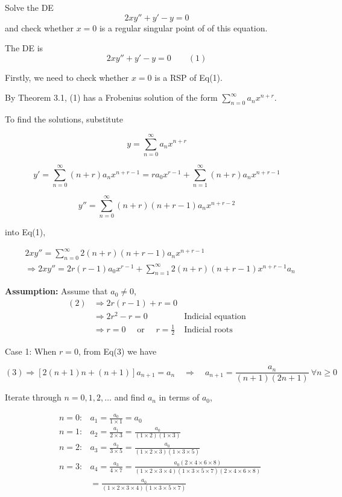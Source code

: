 \begin{example}
    Solve the DE
    \[
        2xy'' + y' - y = 0
    \]
    and check whether $x = 0$ is a regular singular point of of this equation.
\end{example}
\begin{solution}
    The DE is 
    \[
        2xy'' + y' - y = 0 \quad \quad (1)
    \]

    Firstly, we need to check whether $x = 0$ is a RSP of Eq(1).

    By Theorem 3.1,  (1) has a Frobenius solution of the form $\displaystyle \sum^\infty_{n=0} a_n x^{n+r}$.

    To find the solutions, substitute 

    \[
        y = \sum^\infty_{n=0} a_n x^{n+r}
    \]

    \[
        y' = \sum^\infty_{n=0} (n+r) a_n x^{n+r-1} = ra_0 x^{r-1} + \sum^\infty_{n=1} (n+r)a_nx^{n+r-1}
    \]

    \[
        y'' = \sum^\infty_{n=0} (n+r)(n+r-1) a_n x^{n+r-2}
    \]

    into Eq(1),

    \begin{align*}
        &2xy'' = \sum^\infty_{n=0} 2(n+r)(n+r-1)a_n x^{n+r-1}\\
        &\Rightarrow 2xy'' = 2r(r-1)a_0x^{r-1} + \sum^\infty_{n=1} 2(n+r)(n+r-1)x^{n+r-1} a_n
    \end{align*}

    \textbf{Assumption:} Assume that $a_0 \neq 0$, 
    \begin{align*}
        (2) &\Rightarrow 2r(r-1) + r = 0\\
        &\Rightarrow 2r^2 - r = 0 & \text{Indicial equation}\\
        &\Rightarrow r = 0 \quad \text{ or } \quad r = \frac{1}{2} & \text{Indicial roots}
    \end{align*}

    Case 1: When $r = 0$, from Eq(3) we have 

    \[
        (3) \Rightarrow [2(n+1)n + (n+1)]a_{n+1} = a_n \quad \Rightarrow \quad a_{n+1} = \frac{a_n}{(n+1)(2n+1)}\> \forall 
        n \geq 0
    \]

    Iterate through $n = 0, 1, 2, \ldots$ and find $a_n$ in terms of $a_0$,

    \begin{align*}
        &n = 0: &a_1 = \frac{a_0}{1 \times 1} = a_0\\
        &n = 1: &a_2 = \frac{a_1}{2 \times 3} = \frac{a_0}{(1 \times 2)(1 \times 3)}\\
        &n = 2: &a_3 = \frac{a_2}{3 \times 5} = \frac{a_0}{(1 \times 2 \times 3)(1\times 3 \times 5)}\\
        &n = 3: &a_4 = \frac{a_3}{4 \times 7}
        = \frac{a_0(2 \times 4 \times 6 \times 8)}{(1 \times 2 \times 3 \times 4)(1 \times 3 \times 5 \times 7)(2 \times 4 \times 6 \times 8)}\\
        & &= \frac{a_0}{(1 \times 2 \times 3 \times 4)(1 \times 3 \times 5 \times 7)}
    \end{align*}


\end{solution}
